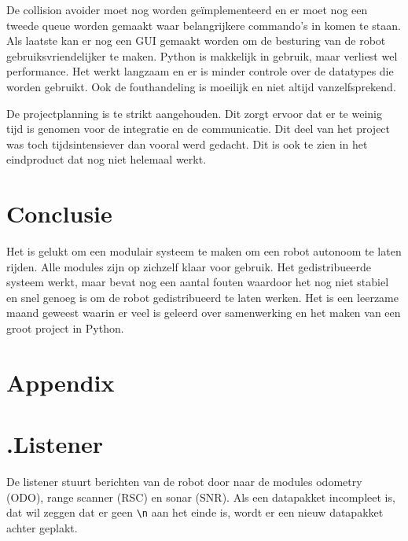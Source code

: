 \documentclass[a4paper,10pt]{article}
\begin{document}
De collision avoider moet nog worden ge\"{i}mplementeerd en er moet nog een tweede queue worden gemaakt waar belangrijkere commando's in komen te staan. Als laatste kan er nog een GUI gemaakt worden om de besturing van de robot gebruiksvriendelijker te maken. Python is makkelijk in gebruik, maar verliest wel performance. Het werkt langzaam en er is minder controle over de datatypes die worden gebruikt. Ook de fouthandeling is moeilijk en niet altijd vanzelfsprekend. 

De projectplanning is te strikt aangehouden. Dit zorgt ervoor dat er te weinig tijd is genomen voor de integratie en de communicatie. Dit deel van het project was toch tijdsintensiever dan vooral werd gedacht. Dit is ook te zien in het eindproduct dat nog niet helemaal werkt.

\section{Conclusie}
Het is gelukt om een modulair systeem te maken om een robot autonoom te laten rijden. Alle modules zijn op zichzelf klaar voor gebruik. Het gedistribueerde systeem werkt, maar bevat nog een aantal fouten waardoor het nog niet stabiel en snel genoeg is om de robot gedistribueerd te laten werken. Het is een leerzame maand geweest waarin er veel is geleerd over samenwerking en het maken van een groot project in Python.

\newpage
\section{Appendix}
\appendix
\section*{\label{listener}\thesection.\quad Listener}
De listener stuurt berichten van de robot door naar de modules odometry (ODO), range scanner (RSC) en sonar (SNR). Als een datapakket incompleet is, dat wil zeggen dat er geen \verb!\n! aan het einde is, wordt er een nieuw datapakket achter geplakt.
\end{document}
